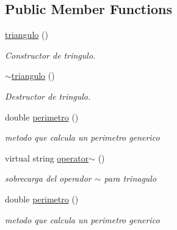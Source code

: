 \subsection*{Public Member Functions}
\begin{DoxyCompactItemize}
\item 
\mbox{\label{classtriangulo_acf725d8856047c7f34f3cc120845d61f}} 
\hyperlink{classtriangulo_acf725d8856047c7f34f3cc120845d61f}{triangulo} ()
\begin{DoxyCompactList}\small\item\em Constructor de tringulo. \end{DoxyCompactList}\item 
\mbox{\label{classtriangulo_a8af9d6bbfd02ed3a82bd30147958ac34}} 
\hyperlink{classtriangulo_a8af9d6bbfd02ed3a82bd30147958ac34}{$\sim$triangulo} ()
\begin{DoxyCompactList}\small\item\em Destructor de tringulo. \end{DoxyCompactList}\item 
\mbox{\label{classtriangulo_a3e689f3bb9dad9e17766aa2adb060c16}} 
double \hyperlink{classtriangulo_a3e689f3bb9dad9e17766aa2adb060c16}{perimetro} ()
\begin{DoxyCompactList}\small\item\em metodo que calcula un perimetro generico \end{DoxyCompactList}\item 
\mbox{\label{classtriangulo_a21620f40b213174d311380b0343777cb}} 
virtual string \hyperlink{classtriangulo_a21620f40b213174d311380b0343777cb}{operator$\sim$} ()
\begin{DoxyCompactList}\small\item\em sobrecarga del operador $\sim$ para trinagulo \end{DoxyCompactList}\item 
\mbox{\label{classtriangulo_a3e689f3bb9dad9e17766aa2adb060c16}} 
double \hyperlink{classtriangulo_a3e689f3bb9dad9e17766aa2adb060c16}{perimetro} ()
\begin{DoxyCompactList}\small\item\em metodo que calcula un perimetro generico \end{DoxyCompactList}\end{DoxyCompactItemize}
